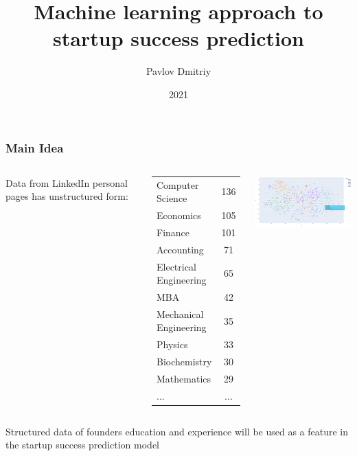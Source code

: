 \documentclass[8pt]{beamer}
\title{\huge{Machine learning approach to startup success prediction}}
\author{Pavlov Dmitriy}
\institute{Moscow Institute of Physics and Technology}
\date{2021}
\begin{document}


\begin{frame}
    \frametitle{Main Idea}
    
    
    
    \begin{columns}
        
        Data from LinkedIn personal pages has unstructured form:
        
        \begin{center}
            \begin{tabular}{ l c }
            Computer Science                                  & 136 \\
            Economics                                         & 105 \\ 
            Finance                                           & 101 \\
            Accounting                                        &  71 \\ 
            Electrical Engineering                            &  65 \\ 
            MBA   &  42 \\ 
            Mechanical Engineering                            &  35 \\ 
            Physics                                           &  33 \\ 
            Biochemistry                                      &  30 \\ 
            Mathematics                                       &  29 \\
            ...                                               & ... \\
            \end{tabular}
        \end{center}
    
    
       \includegraphics[width=7cm]{figures/paper/kMeans-16-03.png}
        
    \end{columns}
    
    Structured data of founders education and experience will be used as a feature in the startup success prediction model 
    
\end{frame}


\end{document}
